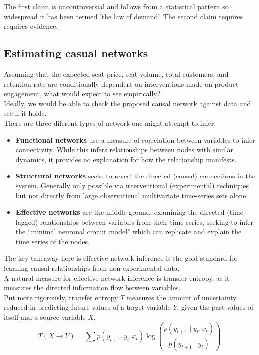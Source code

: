 \documentclass{article}
\begin{document}
The first claim is uncontroversial and follows from a statistical pattern so widespread it has been termed 'the law of demand'. The second claim requires requires evidence.

\subsection{Estimating casual networks}

Assuming that the expected seat price, seat volume, total customers, and retention rate are conditionally dependent on interventions made on product engagement, what would expect to see empirically? \\

Ideally, we would be able to check the proposed causal network against data and see if it holds. \\

There are three diferent types of network one might attempt to infer:

\begin{itemize}
   \item \textbf{Functional networks} use a measure of correlation between variables to infer connectivity. While this infers relationships between nodes with similar dynamics, it provides no explanation for how the relationship manifests.
  \item \textbf{Structural networks} seeks to reveal the directed (causal) connections in the system. Generally only possible via interventional (experimental) techniques but not directly from large observational multivariate time-series sets alone
\item  \textbf{Effective networks} are the middle ground, examining the directed (time-lagged) relationships between variables from their time-series, seeking to infer the “minimal neuronal circuit model” which can replicate and explain the time series of the nodes.
\end{itemize}

The key takeaway here is effective network inference is the gold standard for learning causal relationships from non-experimental data. \\

A natural measure for effective network inference is transfer entropy, as it measures the directed information flow between variables. \\

Put more rigorously, transfer entropy $T$ measures the amount of uncertainty reduced in predicting future values of a target variable $Y$, given the past values of itself and a source variable $X$. 
\[
T(X \rightarrow Y) = \sum p(y_{t+1}, y_t, x_t) \log \left( \frac{p(y_{t+1} \mid y_t, x_t)}{p(y_{t+1} \mid y_t)} \right)
\]
\end{document}
